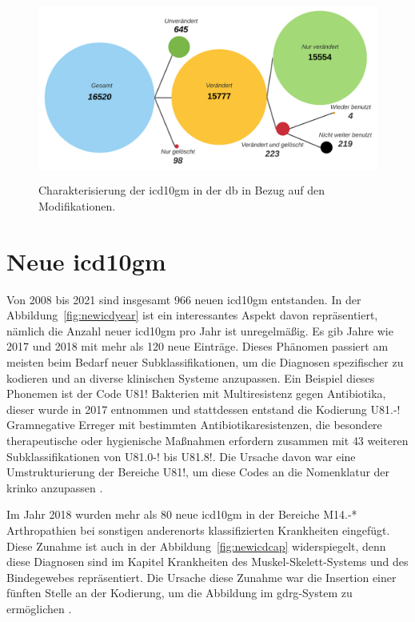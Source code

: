  \begin{figure}[ht]
 	\centering
 	\includegraphics[height=6cm]{figures/icd10gm_quantities}
 	\caption[\acs{icd10gm} in der \acs{db}]{Charakterisierung der \acs{icd10gm} in der \ac{db} in Bezug auf den Modifikationen.}
 	\label{fig:icddb}
 \end{figure}

\section{Neue \acs{icd10gm}} \label{sec:newicd}

Von 2008 bis 2021 sind insgesamt \textsf{966} neuen \ac{icd10gm} entstanden. In der Abbildung~\ref{fig:newicdyear} ist ein interessantes Aspekt davon repräsentiert, nämlich die Anzahl neuer \ac{icd10gm} pro Jahr ist unregelmäßig. Es gib Jahre wie 2017 und 2018 mit mehr als \textsf{120} neue Einträge. Dieses Phänomen passiert am meisten beim Bedarf neuer Subklassifikationen, um die Diagnosen spezifischer zu kodieren und an diverse klinischen Systeme anzupassen. Ein Beispiel dieses Phonemen ist der Code \textsf{U81!} \textsf{Bakterien mit Multiresistenz gegen Antibiotika}, dieser wurde in 2017 entnommen und stattdessen entstand die Kodierung \textsf{U81.-!} \textsf{Gramnegative Erreger mit bestimmten Antibiotikaresistenzen, die besondere therapeutische oder hygienische Maßnahmen erfordern} zusammen mit \textsf{43} weiteren Subklassifikationen von \textsf{U81.0-!} bis \textsf{U81.8!}. Die Ursache davon war eine Umstrukturierung der Bereiche \textsf{U81!}, um diese Codes an die Nomenklatur der \ac{krinko} anzupassen \cite{erreg17}.

Im Jahr 2018 wurden mehr als \textsf{80} neue \ac{icd10gm} in der Bereiche \textsf{M14.-*} \textsf{Arthropathien bei sonstigen anderenorts klassifizierten Krankheiten} eingefügt. Diese Zunahme ist auch in der Abbildung~\ref{fig:newicdcap} widerspiegelt, denn diese Diagnosen sind im Kapitel \textsf{Krankheiten des Muskel-Skelett-Systems und des Bindegewebes} repräsentiert. Die Ursache diese Zunahme war die Insertion einer fünften Stelle an der Kodierung, um die Abbildung im \ac{gdrg}-System zu ermöglichen \cite{musk18}.

